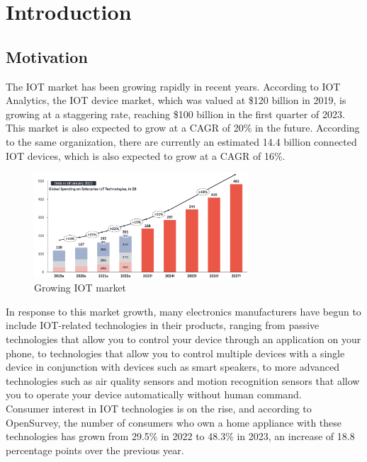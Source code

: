 \section{\Large{Introduction}}
\subsection {\large{Motivation}}
The IOT market has been growing rapidly in recent years. According to IOT Analytics, the IOT device market, which was valued at \$120 billion in 2019, is growing at a staggering rate, reaching \$100 billion in the first quarter of 2023. This market is also expected to grow at a CAGR of 20\% in the future. According to the same organization, there are currently an estimated 14.4 billion connected IOT devices, which is also expected to grow at a CAGR of 16\%. \\

\begin{figure}[ht]
    \includegraphics[width=8cm]{imgs/introduction/iot_market_growing.png}
    \caption{Growing IOT market}
    \renewcommand{\thefigure}{\thesubsection.\arabic{figure}}
\end{figure}

In response to this market growth, many electronics manufacturers have begun to include IOT-related technologies in their products, ranging from passive technologies that allow you to control your device through an application on your phone, to technologies that allow you to control multiple devices with a single device in conjunction with devices such as smart speakers, to more advanced technologies such as air quality sensors and motion recognition sensors that allow you to operate your device automatically without human command. \\

Consumer interest in IOT technologies is on the rise, and according to OpenSurvey, the number of consumers who own a home appliance with these technologies has grown from 29.5\% in 2022 to 48.3\% in 2023, an increase of 18.8 percentage points over the previous year.\cite{iot-market-size} \\\\

